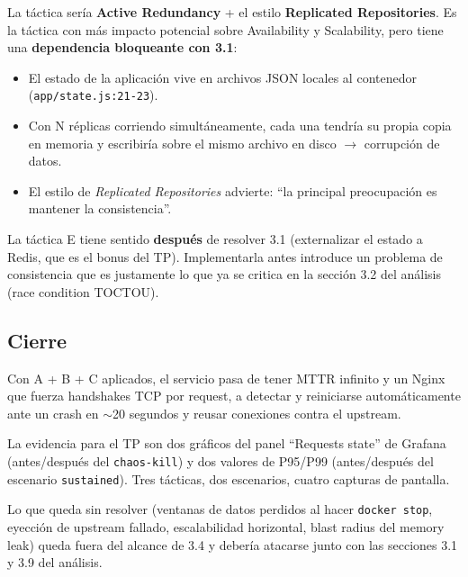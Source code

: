 La táctica sería \textbf{Active Redundancy} + el estilo \textbf{Replicated Repositories}. Es la táctica con más impacto potencial sobre Availability y Scalability, pero tiene una \textbf{dependencia bloqueante con 3.1}:
\begin{itemize}
    \item El estado de la aplicación vive en archivos JSON locales al contenedor (\texttt{app/state.js:21-23}).
    \item Con N réplicas corriendo simultáneamente, cada una tendría su propia copia en memoria y escribiría sobre el mismo archivo en disco $\rightarrow$ corrupción de datos.
    \item El estilo de \emph{Replicated Repositories} advierte: ``la principal preocupación es mantener la consistencia''.
\end{itemize}
La táctica E tiene sentido \textbf{después} de resolver 3.1 (externalizar el estado a Redis, que es el bonus del TP). Implementarla antes introduce un problema de consistencia que es justamente lo que ya se critica en la sección 3.2 del análisis (race condition TOCTOU).

\subsection{Cierre}

Con A + B + C aplicados, el servicio pasa de tener MTTR infinito y un Nginx que fuerza handshakes TCP por request, a detectar y reiniciarse automáticamente ante un crash en $\sim$20 segundos y reusar conexiones contra el upstream.

La evidencia para el TP son dos gráficos del panel ``Requests state'' de Grafana (antes/después del \texttt{chaos-kill}) y dos valores de P95/P99 (antes/después del escenario \texttt{sustained}). Tres tácticas, dos escenarios, cuatro capturas de pantalla.

Lo que queda sin resolver (ventanas de datos perdidos al hacer \texttt{docker stop}, eyección de upstream fallado, escalabilidad horizontal, blast radius del memory leak) queda fuera del alcance de 3.4 y debería atacarse junto con las secciones 3.1 y 3.9 del análisis.
